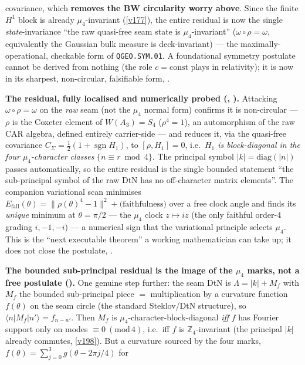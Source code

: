 \documentclass[11pt,a4paper]{article}
\newcommand{\Z}{\mathbb Z}
\begin{document}
\begin{keybox}
covariance, which \textbf{removes the BW circularity worry above}. Since the finite $H^1$ block is already
$\mu_4$-invariant (\vref{v177}), the entire residual is now the single \emph{state}-invariance ``the raw
quasi-free seam state is $\mu_4$-invariant'' ($\omega\circ\rho=\omega$, equivalently the Gaussian bulk
measure is deck-invariant) --- the maximally-operational, checkable form of \texttt{QGEO.SYM.01}. A
foundational symmetry postulate cannot be derived from nothing (the role $c=\text{const}$ plays in
relativity); it is now in its sharpest, non-circular, falsifiable form, \mO.
\par\smallskip\noindent\textbf{The residual, fully localised and numerically probed
(, ).} Attacking
$\omega\circ\rho=\omega$ on the \emph{raw} seam (not the $\mu_4$ normal form) confirms it is non-circular
--- $\rho$ is the Coxeter element of $W(A_3)=S_4$ ($\rho^4=1$), an automorphism of the raw CAR algebra,
defined entirely carrier-side --- and reduces it, via the quasi-free covariance
$C_\Sigma=\tfrac12(1+\operatorname{sgn}H_1)$, to $[\rho,H_1]=0$, i.e.\ \emph{$H_1$ is block-diagonal in the
four $\mu_4$-character classes} $\{n\equiv r\bmod4\}$. The principal symbol $|k|=\mathrm{diag}(|n|)$ passes
automatically, so the entire residual is the single bounded statement ``the sub-principal symbol of the raw
DtN has no off-character matrix elements''. The companion variational scan minimises
$E_{\mathrm{fail}}(\theta)=\|\rho(\theta)^4-1\|^2+\text{(faithfulness)}$ over a free clock angle and finds
its \emph{unique} minimum at $\theta=\pi/2$ --- the $\mu_4$ clock $z\mapsto iz$ (the only faithful order-$4$
grading $i,-1,-i$) --- a numerical sign that the variational principle selects $\mu_4$. This is the
``next executable theorem'' a working mathematician can take up; it does not close the postulate, \mO.
\par\smallskip\noindent\textbf{The bounded sub-principal residual is the image of the $\mu_4$ marks, not a
free postulate ().} One genuine step further: the seam DtN is
$\Lambda=|k|+M_f$ with $M_f$ the bounded sub-principal piece $=$ multiplication by a curvature function
$f(\theta)$ on the seam circle (the standard Steklov/DtN structure), so $\langle n|M_f|n'\rangle=f_{n-n'}$.
Then $M_f$ is $\mu_4$-character-block-diagonal \emph{iff} $f$ has Fourier support only on modes
$\equiv0\ (\mathrm{mod}\,4)$, i.e.\ iff $f$ is $\Z_4$-invariant (the principal $|k|$ already commutes,
\vref{v198}). But a curvature sourced by the four marks, $f(\theta)=\sum_{j=0}^{3}g(\theta-2\pi j/4)$ for

\end{keybox}
\end{document}
